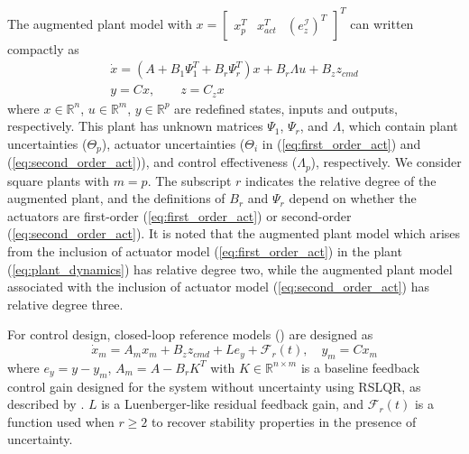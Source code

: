 \documentclass[english]{ifacconf}
\begin{document}
The augmented plant model with $x = \begin{bmatrix} x_p^T & x_{act}^T & (e_z^{\mathcal{I}})^T\end{bmatrix}^T$ can written compactly as
\begin{equation}
\begin{array}{c}
\dot{x}= \left(A+B_{1}\Psi_{1}^{T}+B_{r}\Psi_{r}^{T}\right) x+B_{r}\Lambda u+B_{z}z_{cmd}\\
y=Cx,\qquad z=C_{z}x
\end{array} \label{eq:augmented_plant}
\end{equation}
where $x\in\mathbb{R}^{n}$, $u\in\mathbb{R}^{m}$, $y\in\mathbb{R}^{p}$ are redefined states, inputs and outputs, respectively. 
This plant has unknown matrices $\Psi_1$, $\Psi_r$, and $\Lambda$, which contain plant uncertainties ($\Theta_p$), actuator uncertainties ($\Theta_i$ in (\ref{eq:first_order_act}) and (\ref{eq:second_order_act})), and control effectiveness ($\Lambda_p$), respectively. We consider square plants with $m = p$. The subscript $r$ indicates the relative degree of the augmented plant, and the definitions of $B_r$ and $\Psi_r$ depend on whether the actuators are first-order (\ref{eq:first_order_act}) or second-order (\ref{eq:second_order_act}). It is noted that the augmented plant model which arises from the inclusion of actuator model (\ref{eq:first_order_act}) in the plant (\ref{eq:plant_dynamics}) has relative degree two, while the augmented plant model associated with the inclusion of actuator model (\ref{eq:second_order_act}) has relative degree three. 

For control design, closed-loop reference models (\cite{gibson2013adaptive}) are designed as
\begin{equation}
\dot{x}_m = A_m x_m + B_z z_{cmd} + L e_y + \mathcal{F}_r(t), \quad y_m = C x_m
\end{equation}
where $e_y = y - y_m$, $A_m = A - B_r K^T$ with $K\in\mathbb{R}^{n\times m}$ is a baseline feedback control gain designed for the system without uncertainty using RSLQR, as described by \cite{lavretsky2013robust}. $L$ is a Luenberger-like residual feedback gain, and $\mathcal{F}_r(t)$ is a function used when $r \geq 2$ to recover stability properties in the presence of uncertainty. 
\end{document}
